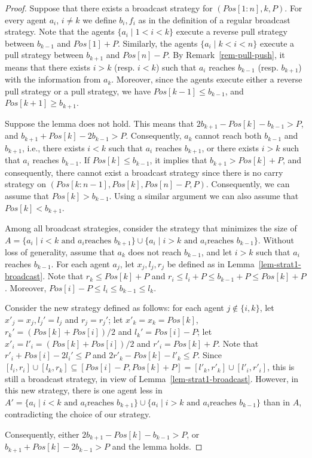 \documentclass{article}
\newcommand\broadcast{broadcast\xspace}
\newcommand\subproblem{carry\xspace}
\begin{document}
\begin{proof}
Suppose that there exists a \broadcast strategy for
$(Pos[1:n],k,P)$.  For every agent $a_i$, $i \neq k$ we define $b_i,
f_i$ as in the definition of a regular broadcast strategy. Note that the agents $\{a_i \mid 1 < i < k\}$
execute a reverse pull strategy between $b_{k-1}$ and
$Pos[1]+P$. Similarly, the agents $\{a_i \mid k < i < n\}$ execute a
pull strategy between $b_{k+1}$ and $Pos[n]-P$.  By
Remark~\ref{rem-pull-push}, it means that there exists $i > k$
(resp. $i < k$) such that $a_i$ reaches $b_{k-1}$ (resp. $b_{k+1}$)
with the information from $a_k$.  Moreover, since the agents execute either a reverse pull 
strategy or a pull strategy, we have $Pos[k-1] \leq b_{k-1}$, and $Pos[k+1]\geq
b_{k+1}$.

Suppose the lemma does not hold. This means that $2b_{k+1} - Pos[k] -
b_{k-1} > P$, and $b_{k+1} + Pos[k] - 2b_{k-1} > P$. Consequently,
$a_k$ cannot reach both $b_{k-1}$ and $b_{k+1}$, i.e., there exists $i
<k$ such that $a_i$ reaches $b_{k+1}$, or there exists $i > k$ such
that $a_i$ reaches $b_{k-1}$. If $Pos[k] \leq b_{k-1}$, it implies
that $b_{k+1} > Pos[k] + P$, and consequently, there cannot exist a
{\broadcast} strategy since there is no \subproblem strategy on
$(Pos[k:n-1],Pos[k],Pos[n]-P,P)$. Consequently, we can assume that
$Pos[k] > b_{k-1}$. Using a similar argument we can also assume that $Pos[k] < b_{k+1}$. 



Among all {\broadcast} strategies, consider the strategy that
minimizes the size of $A = \{a_i \mid i < k \mbox{ and } a_i \mbox{
  reaches } b_{k+1}\} \cup \{a_i \mid i > k \mbox{ and } a_i \mbox{
  reaches } b_{k-1}\}$. Without loss of generality, assume that $a_k$
does not reach $b_{k-1}$, and let $i > k$ such that $a_i$ reaches
$b_{k-1}$. For each agent $a_j$, let $x_j, l_j, r_j$ be defined as in
Lemma~\ref{lem-strat1-broadcast}. Note that $r_k \leq Pos[k]+P$ and
$r_i \leq l_i + P \leq b_{k-1} + P \leq Pos[k]+P$. Moreover, $Pos[i] -
P \leq l_i \leq b_{k-1} \leq l_k$.

Consider the new strategy defined as follows: for each agent $j \notin
\{i,k\}$, let $x'_j = x_j, l_j'= l_j$ and $r_j = r_j'$; let $x'_k=x_k =
Pos[k]$, $r_k' = (Pos[k]+Pos[i])/2$ and $l_k' = Pos[i]-P$; let $x'_i =
l'_i = (Pos[k]+Pos[i])/2$ and $r'_i = Pos[k] +P$. Note that
$r'_i+Pos[i]-2l_i' \leq P$ and $2r'_k-Pos[k]-l'_k \leq P$.  Since
$[l_i,r_i] \cup [l_k,r_k] \subseteq [Pos[i]-P,Pos[k]+P] = [l'_k,r'_k]
\cup [l'_i,r'_i]$, this is still a {\broadcast} strategy, in view of
Lemma~\ref{lem-strat1-broadcast}. However, in this new strategy, there
is one agent less in $A' = \{a_i \mid i < k \mbox{ and } a_i \mbox{
  reaches } b_{k+1}\} \cup \{a_i \mid i > k \mbox{ and } a_i \mbox{
  reaches } b_{k-1}\}$ than in $A$, contradicting the choice of our
strategy. 

Consequently, either $2b_{k+1} - Pos[k] - b_{k-1} > P$, or $b_{k+1} +
Pos[k] - 2b_{k-1} > P$ and the lemma holds. 
\end{proof}
\end{document}

